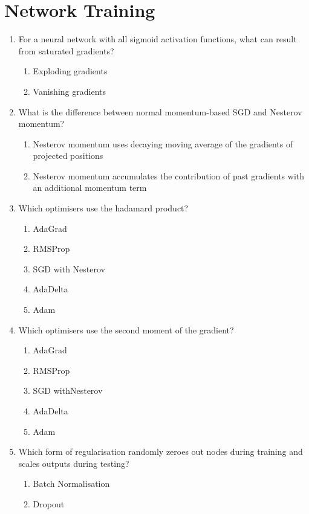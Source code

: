 \documentclass{report}
\numberwithin{equation}{section}
\begin{document}
\section{Network Training}
\begin{enumerate}
\item For a neural network with all sigmoid activation functions, what can result from saturated gradients?
\begin{enumerate}[label=\alph*.]
\item Exploding gradients
\item Vanishing gradients
\end{enumerate}
\item What is the difference between normal momentum-based SGD and Nesterov momentum?
\begin{enumerate}[label=\alph*.]
\item Nesterov momentum uses decaying moving average of the gradients of projected positions
\item Nesterov momentum accumulates the contribution of past gradients with an additional momentum term
\end{enumerate}
\item Which optimisers use the hadamard product?
\begin{enumerate}[label=\alph*.]
\item AdaGrad
\item RMSProp
\item SGD with Nesterov
\item AdaDelta
\item Adam
\end{enumerate}
\item Which optimisers use the second moment of the gradient?
\begin{enumerate}[label=\alph*.]
\item AdaGrad
\item RMSProp
\item SGD withNesterov
\item AdaDelta
\item Adam
\end{enumerate}
\item Which form of regularisation randomly zeroes out nodes during training and scales outputs during testing?
\begin{enumerate}[label=\alph*.]
\item Batch Normalisation
\item Dropout
\end{enumerate}

\end{enumerate}
\end{document}
